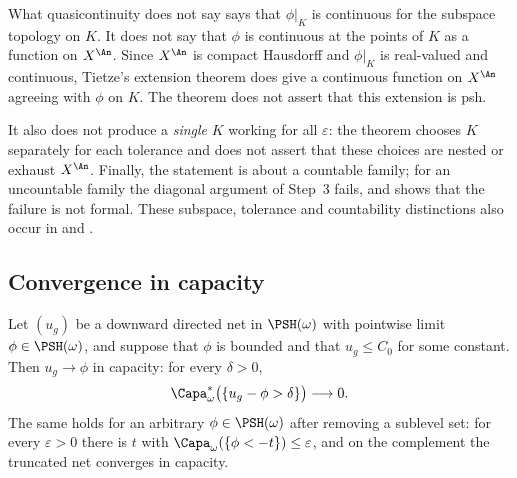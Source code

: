 \begin{warning}{What quasicontinuity does not say}
\label{warn:ch48-qc-not}
 says that $\phi|_K$ is continuous for the
subspace topology on $K$.  It does not say that $\phi$ is continuous at
the points of $K$ as a function on $X^{\An}$. Since $X^{\An}$ is
compact Hausdorff and $\phi|_K$ is real-valued and continuous, Tietze's
extension theorem does give a continuous function on $X^{\An}$
agreeing with $\phi$ on $K$. The theorem does not assert that this
extension is psh.

It also does not produce a \emph{single} $K$ working for all
$\varepsilon$: the theorem chooses $K$ separately for each tolerance
and does not assert that these choices are nested or exhaust $X^{\An}$.  Finally, the
statement is about a countable family; for an uncountable family the
diagonal argument of Step~3 fails, and
 shows that the failure is not
formal.  These subspace, tolerance and countability distinctions also occur in
 and .
\end{warning}

\subsection{Convergence in capacity}
\label{sec:ch48-convergence-capacity}

\begin{proposition}
\label{prop:ch48-decreasing-capacity}
Let $(u_g)$ be a downward directed net in $\PSH(\omega)$ with
pointwise limit $\phi\in\PSH(\omega)$, and suppose that $\phi$ is
bounded and that $u_g\le C_0$ for some constant.  Then
$u_g\to\phi$ in capacity: for every $\delta>0$,
\[
 \Capa^*_\omega\bigl(\{u_g-\phi>\delta\}\bigr)\longrightarrow0 .
\]
The same holds for an arbitrary $\phi\in\PSH(\omega)$ after removing a
sublevel set: for every $\varepsilon>0$ there is $t$ with
$\Capa_\omega(\{\phi<-t\})\le\varepsilon$, and on the complement the
truncated net converges in capacity.
\end{proposition}

